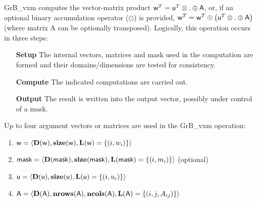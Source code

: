 {\sf GrB\_vxm} computes the vector-matrix product ${\sf w}^T = {\sf
u}^T \otimes . \oplus {\sf A}$, or, if an optional binary accumulation
operator ($\odot$) is provided, ${\sf w}^T = {\sf w}^T \odot
\left({\sf u}^T \otimes . \oplus {\sf A}\right)$ (where matrix {\sf A}
 can be optionally transposed).  Logically, this operation
occurs in three steps:
\begin{enumerate}[leftmargin=0.75in]
\item[\bf Setup] The internal vectors, matrices and mask used in the computation are formed and their domains/dimensions are tested for consistency.
\item[\bf Compute] The indicated computations are carried out.
\item[\bf Output] The result is written into the output vector, possibly under control of a mask.
\end{enumerate}

Up to four argument vectors or matrices are used in the {\sf GrB\_vxm} operation:
\begin{enumerate}
	\item ${\sf w} = \langle \bold{D}({\sf w}),\bold{size}({\sf w}),\bold{L}({\sf w}) = \{(i,w_i) \} \rangle$
	\item ${\sf mask} = \langle \bold{D}({\sf mask}),\bold{size}({\sf mask}),\bold{L}({\sf mask}) = \{(i,m_i) \} \rangle$ (optional)
	\item ${\sf u} = \langle \bold{D}({\sf u}),\bold{size}({\sf u}),\bold{L}({\sf u}) = \{(i,u_i) \} \rangle$
	\item ${\sf A} = \langle \bold{D}({\sf A}),\bold{nrows}({\sf A}), \bold{ncols}({\sf A}),\bold{L}({\sf A}) = \{(i,j,A_{ij}) \} \rangle$
\end{enumerate}

